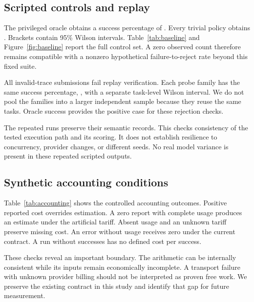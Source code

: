 \documentclass{article}
\begin{document}
\subsection{Scripted controls and replay}
The privileged oracle obtains a success percentage of \OracleRate{}. Every trivial policy obtains \FloorRate{}. Brackets contain 95\% Wilson intervals. Table~\ref{tab:baseline} and Figure~\ref{fig:baseline} report the full control set. A zero observed count therefore remains compatible with a nonzero hypothetical failure-to-reject rate beyond this fixed suite.\par
\begin{table}[ht]\centering\small\caption{Scripted controls on the fixed suite. Cost entries use simulated tokens and an artificial tariff. They are not provider spend. Unavailable ratios have no successful denominator.}\label{tab:baseline}\end{table}

All \ProbeCount{} invalid-trace submissions fail replay verification. Each probe family has the same success percentage, \FloorRate{}, with a separate task-level Wilson interval. We do not pool the families into a larger independent sample because they reuse the same tasks. Oracle success provides the positive case for these rejection checks.\par
The repeated runs preserve their semantic records. This checks consistency of the tested execution path and its scoring. It does not establish resilience to concurrency, provider changes, or different seeds. No real model variance is present in these repeated scripted outputs.\par
\subsection{Synthetic accounting conditions}
Table~\ref{tab:accounting} shows the controlled accounting outcomes. Positive reported cost overrides estimation. A zero report with complete usage produces an estimate under the artificial tariff. Absent usage and an unknown tariff preserve missing cost. An error without usage receives zero under the current contract. A run without successes has no defined cost per success.\par
\begin{table}[ht]\centering\small\caption{Synthetic accounting fixtures applied to runner reports. Values test cost handling only. The error row represents the current zero-cost convention, not verified provider billing.}\label{tab:accounting}\end{table}
These checks reveal an important boundary. The arithmetic can be internally consistent while its inputs remain economically incomplete. A transport failure with unknown provider billing should not be interpreted as proven free work. We preserve the existing contract in this study and identify that gap for future measurement.\par
\end{document}
